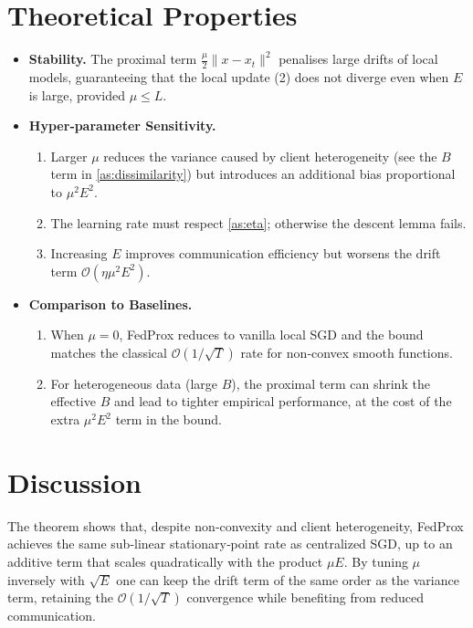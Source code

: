 \documentclass[11pt]{article}
\begin{document}
\section*{Theoretical Properties}
\begin{itemize}
\item \textbf{Stability.} The proximal term $\frac{\mu}{2}\|x-x_t\|^2$ penalises large drifts of local models, guaranteeing that the local update (2) does not diverge even when $E$ is large, provided $\mu\le L$.
\item \textbf{Hyper‑parameter Sensitivity.}
    \begin{enumerate}
        \item Larger $\mu$ reduces the variance caused by client heterogeneity (see the $B$ term in \ref{as:dissimilarity}) but introduces an additional bias proportional to $\mu^2E^2$.
        \item The learning rate must respect \ref{as:eta}; otherwise the descent lemma fails.
        \item Increasing $E$ improves communication efficiency but worsens the drift term $\mathcal{O}(\eta\mu^2E^2)$.
    \end{enumerate}
\item \textbf{Comparison to Baselines.}
    \begin{enumerate}
        \item When $\mu=0$, FedProx reduces to vanilla local SGD and the bound matches the classical $\mathcal{O}(1/\sqrt{T})$ rate for non‑convex smooth functions.
        \item For heterogeneous data (large $B$), the proximal term can shrink the effective $B$ and lead to tighter empirical performance, at the cost of the extra $\mu^2E^2$ term in the bound.
    \end{enumerate}
\end{itemize}

\section*{Discussion}
The theorem shows that, despite non‑convexity and client heterogeneity, FedProx achieves the same sub‑linear stationary‑point rate as centralized SGD, up to an additive term that scales quadratically with the product $\mu E$. By tuning $\mu$ inversely with $\sqrt{E}$ one can keep the drift term of the same order as the variance term, retaining the $\mathcal{O}(1/\sqrt{T})$ convergence while benefiting from reduced communication.
\end{document}
